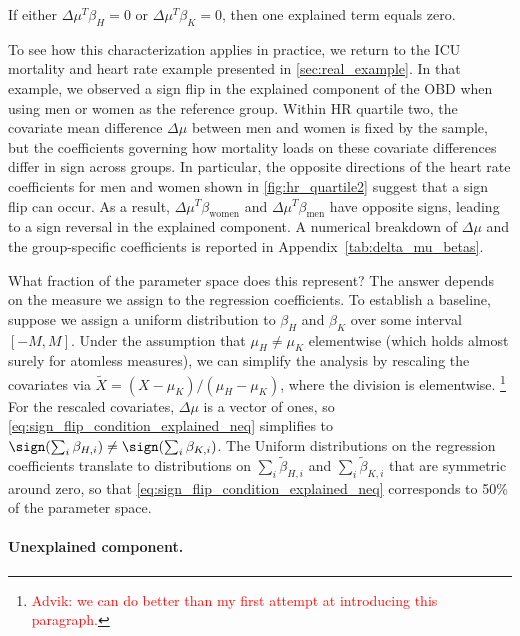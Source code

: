 \begin{remark}
    If either $\Delta\mu^T \beta_H = 0$ or  $\Delta\mu^T \beta_K = 0$, then one explained term equals zero.
\end{remark}

To see how this characterization applies in practice, we return to the ICU mortality and heart rate example presented in \cref{sec:real_example}. In that example, we observed a sign flip in the explained component of the OBD when using men or women as the reference group. Within HR quartile two, the covariate mean difference $\Delta\mu$ between men and women is fixed by the sample, but the coefficients governing how mortality loads on these covariate differences differ in sign across groups. In particular, the opposite directions of the heart rate coefficients for men and women shown in \cref{fig:hr_quartile2} suggest that a sign flip can occur. As a result, $\Delta\mu^T\beta_{\text{women}}$ and $\Delta\mu^T\beta_{\text{men}}$ have opposite signs, leading to a sign reversal in the explained component. A numerical breakdown of $\Delta\mu$ and the group-specific coefficients is reported in Appendix~\cref{tab:delta_mu_betas}.

What fraction of the parameter space does this represent?
The answer depends on the measure we assign to the regression coefficients.
To establish a baseline, suppose we assign a uniform distribution to \( \beta_H \) and \( \beta_K \) over some interval \( [-M, M] \).
Under the assumption that \( \mu_H \neq \mu_K \) elementwise (which holds almost surely for atomless measures), we can simplify the analysis by rescaling the covariates via \( \tilde{X} = (X - \mu_K) / (\mu_H - \mu_K) \), where the division is elementwise.%
\footnote{\textcolor{red}{Advik: we can do better than my first attempt at introducing this paragraph.}}
For the rescaled covariates, \( \Delta \mu \) is a vector of ones, so \cref{eq:sign_flip_condition_explained_neq} simplifies to \( \sign\!\left(\sum_{i} \beta_{H,i}\right) \neq \sign\!\left(\sum_{i} \beta_{K,i}\right) \).
The Uniform distributions on the regression coefficients translate to distributions on \( \sum_i \tilde{\beta}_{H,i} \) and \( \sum_i \tilde{\beta}_{K,i} \) that are symmetric around zero, so that \cref{eq:sign_flip_condition_explained_neq} corresponds to 50\% of the parameter space.

\paragraph{Unexplained component.}

